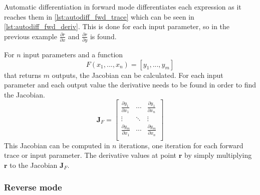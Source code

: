 Automatic differentiation in forward mode differentiates each expression as it reaches them in \autoref{lst:autodiff_fwd_trace} which can be seen in \autoref{lst:autodiff_fwd_deriv}. This is done for each input parameter, so in the previous example $\frac{\partial r}{\partial x}$ and $\frac{\partial r}{\partial y}$ is found.

For $n$ input parameters and a function $$F(x_1, ..., x_n) = [ y_1, ..., y_m ]$$ that returns $m$ outputs, the Jacobian can be calculated. For each input parameter and each output value the derivative needs to be found in order to find the Jacobian.
$$\bm{J}_F = \left[
  \begin{array}{ccc}
    \frac{\partial y_1}{\partial x_1} & \cdots & \frac{\partial y_1}{\partial x_n}\\
    \vdots & \ddots & \vdots\\
    \frac{\partial y_m}{\partial x_1} & \cdots & \frac{\partial y_m}{\partial x_n}\\
  \end{array}
\right]$$
This Jacobian can be computed in $n$ iterations, one iteration for each forward trace or input parameter.
The derivative values at point $\bm{r}$ by simply multiplying $\bm{r}$ to the Jacobian $\bm{J}_F$.

\subsubsection{Reverse mode}%
\label{ssub:reverse_mode}






